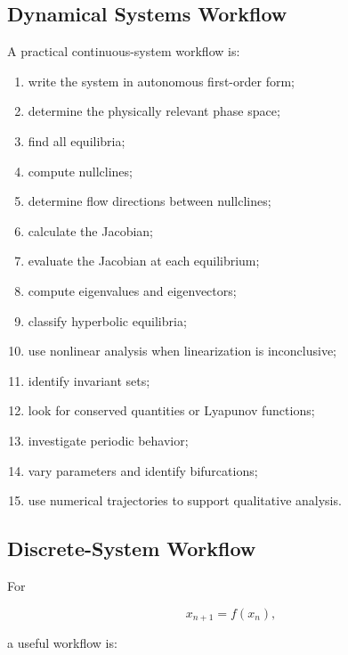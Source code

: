 \subsection{Dynamical Systems Workflow}
\label{subsec:dynamical-systems-workflow}

A practical continuous-system workflow is:

\begin{enumerate}
    \item write the system in autonomous first-order form;
    \item determine the physically relevant phase space;
    \item find all equilibria;
    \item compute nullclines;
    \item determine flow directions between nullclines;
    \item calculate the Jacobian;
    \item evaluate the Jacobian at each equilibrium;
    \item compute eigenvalues and eigenvectors;
    \item classify hyperbolic equilibria;
    \item use nonlinear analysis when linearization is inconclusive;
    \item identify invariant sets;
    \item look for conserved quantities or Lyapunov functions;
    \item investigate periodic behavior;
    \item vary parameters and identify bifurcations;
    \item use numerical trajectories to support qualitative analysis.
\end{enumerate}

\subsection{Discrete-System Workflow}
\label{subsec:discrete-system-workflow}

For

\[
x_{n+1}=f(x_n),
\]

a useful workflow is:

